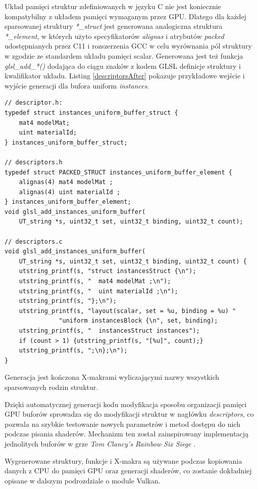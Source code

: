 Układ pamięci struktur zdefiniowanych w języku C nie jest koniecznie kompatybilny z układem pamięci wymaganym przez GPU.
Dlatego dla każdej sparsowanej struktury \textit{*\_struct} jest generowana analogiczna struktura \textit{*\_element}, w których użyto specyfikatorów \textit{alignas} i atrybutów \textit{packed} udostępnianych przez C11 i rozszerzenia GCC w celu wyrównania pól struktury w zgodzie ze standardem układu pamięci scalar.
Generowana jest też funkcja \textit{glsl\_add\_*()} dodająca do ciągu znaków z kodem GLSL definicje struktury i kwalifikator układu.
Listing \ref{descriptorsAfter} pokazuje przykładowe wejście i wyjście generacji dla bufora uniform \textit{instances}.
\lstset{language=C}
\begin{lstlisting}[caption={Przykładowe wejście i wyjście generacji dla bufora uniform},captionpos=b,label={descriptorsAfter}]
// descriptor.h:
typedef struct instances_uniform_buffer_struct {
	mat4 modelMat;
	uint materialId;
} instances_uniform_buffer_struct;
	
// descriptors.h
typedef struct PACKED_STRUCT instances_uniform_buffer_element {
	alignas(4) mat4 modelMat ;
	alignas(4) uint materialId ;
} instances_uniform_buffer_element;
void glsl_add_instances_uniform_buffer(
	UT_string *s, uint32_t set, uint32_t binding, uint32_t count);

// descriptors.c
void glsl_add_instances_uniform_buffer(
	UT_string *s, uint32_t set, uint32_t binding, uint32_t count) {
	utstring_printf(s, "struct instancesStruct {\n");
	utstring_printf(s, "  mat4 modelMat ;\n");
	utstring_printf(s, "  uint materialId ;\n");
	utstring_printf(s, "};\n");
	utstring_printf(s, "layout(scalar, set = %u, binding = %u) "
			   "uniform instancesBlock {\n", set, binding);
	utstring_printf(s, "  instancesStruct instances");
	if (count > 1) {utstring_printf(s, "[%u]", count);}
	utstring_printf(s, ";\n};\n");
}
\end{lstlisting}
Generacja jest kończona X-makrami wyliczającymi nazwy wszystkich sparsowanych rodzin struktur. 

Dzięki automatycznej generacji kodu modyfikacja sposobu organizacji pamięci GPU buforów sprowadza się do modyfikacji struktur w nagłówku \textit{descriptors}, co pozwala na szybkie testowanie nowych parametrów i metod dostępu do nich podczas pisania shaderów.
Mechanizm ten został zainspirowany implementacją jednolitych buforów w grze \textit{Tom Clancy's Rainbow Six Siege} \cite{RAINBOWSIXSIEGE}.

Wygenerowane struktury, funkcje i X-makra są używane podczas kopiowania danych z CPU do pamięci GPU oraz generacji shaderów, co zostanie dokładniej opisane w dalszym podrozdziale o module Vulkan.

